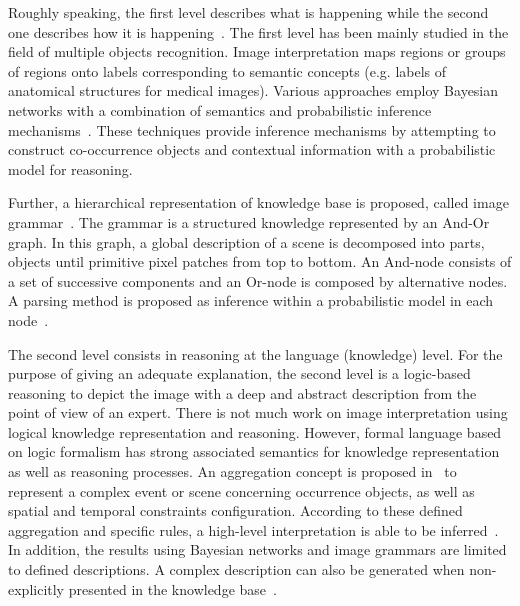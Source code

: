 \documentclass{article}
\begin{document}
Roughly speaking, the first level describes what is happening while the second one describes how it is happening~\cite{tsotsos1992image}.
The first level has been mainly studied in the field of multiple objects recognition. 
Image interpretation maps regions or groups of regions onto labels corresponding to semantic concepts (e.g. labels of anatomical structures for medical images).
Various approaches employ Bayesian networks with a combination of semantics and probabilistic inference mechanisms~\cite{Luo2005Bayesian,Niko2009evidence,Singhal2003proba}.
These techniques provide inference mechanisms by attempting to construct co-occurrence objects and contextual information with a probabilistic model for reasoning.

Further, a hierarchical representation of knowledge base is proposed, called image grammar~\cite{tu2014joint,zhu2006stochastic}. The grammar is a structured knowledge represented by an And-Or graph.
In this graph, a global description of a scene is decomposed into parts, objects until primitive pixel patches from top to bottom.
An And-node consists of a set of successive components and an Or-node is composed by alternative nodes.
A parsing method is proposed as inference within a probabilistic model in each node~\cite{han2009bottom,wu2011numerical}. 

The second level consists in reasoning at the language (knowledge) level.
For the purpose of giving an adequate explanation, the second level is a logic-based reasoning to depict the image with a deep and abstract description from the point of view of an expert.
There is not much work on image interpretation using logical knowledge representation and reasoning. 
However, formal language based on logic formalism has  strong associated semantics for knowledge representation as well as reasoning processes. 
An aggregation concept is proposed in~\cite{Espinosa07multimedia} to represent a complex event or scene concerning occurrence objects, as well as spatial and temporal constraints configuration.
According to these defined aggregation and specific rules, a high-level interpretation is able to be inferred~\cite{neumann2008scene}.
In addition, the results using Bayesian networks and image grammars are limited to defined descriptions.
A complex description can also be generated when non-explicitly presented in the knowledge base~\cite{atif2014explanatory}.


\end{document}
